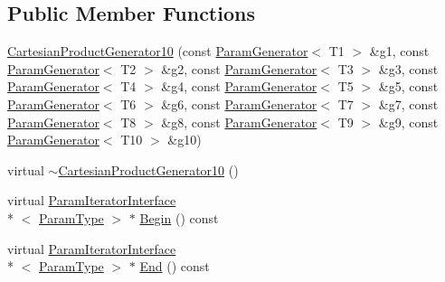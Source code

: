 \subsection*{Public Member Functions}
\begin{DoxyCompactItemize}
\item 
\hyperlink{classtesting_1_1internal_1_1_cartesian_product_generator10_a53d945670e910c0baaf14f3d25f1bbb6}{Cartesian\-Product\-Generator10} (const \hyperlink{classtesting_1_1internal_1_1_param_generator}{Param\-Generator}$<$ T1 $>$ \&g1, const \hyperlink{classtesting_1_1internal_1_1_param_generator}{Param\-Generator}$<$ T2 $>$ \&g2, const \hyperlink{classtesting_1_1internal_1_1_param_generator}{Param\-Generator}$<$ T3 $>$ \&g3, const \hyperlink{classtesting_1_1internal_1_1_param_generator}{Param\-Generator}$<$ T4 $>$ \&g4, const \hyperlink{classtesting_1_1internal_1_1_param_generator}{Param\-Generator}$<$ T5 $>$ \&g5, const \hyperlink{classtesting_1_1internal_1_1_param_generator}{Param\-Generator}$<$ T6 $>$ \&g6, const \hyperlink{classtesting_1_1internal_1_1_param_generator}{Param\-Generator}$<$ T7 $>$ \&g7, const \hyperlink{classtesting_1_1internal_1_1_param_generator}{Param\-Generator}$<$ T8 $>$ \&g8, const \hyperlink{classtesting_1_1internal_1_1_param_generator}{Param\-Generator}$<$ T9 $>$ \&g9, const \hyperlink{classtesting_1_1internal_1_1_param_generator}{Param\-Generator}$<$ T10 $>$ \&g10)
\item 
virtual \hyperlink{classtesting_1_1internal_1_1_cartesian_product_generator10_a9f3d5098141855055fe174dda57092d7}{$\sim$\-Cartesian\-Product\-Generator10} ()
\item 
virtual \hyperlink{classtesting_1_1internal_1_1_param_iterator_interface}{Param\-Iterator\-Interface}\\*
$<$ \hyperlink{classtesting_1_1internal_1_1_cartesian_product_generator10_aa483a5910f5dbfb974b43f93853f4b29}{Param\-Type} $>$ $\ast$ \hyperlink{classtesting_1_1internal_1_1_cartesian_product_generator10_a1b3ac46cd0f29e9654ee0afa18490798}{Begin} () const 
\item 
virtual \hyperlink{classtesting_1_1internal_1_1_param_iterator_interface}{Param\-Iterator\-Interface}\\*
$<$ \hyperlink{classtesting_1_1internal_1_1_cartesian_product_generator10_aa483a5910f5dbfb974b43f93853f4b29}{Param\-Type} $>$ $\ast$ \hyperlink{classtesting_1_1internal_1_1_cartesian_product_generator10_ab8a229952b2bf4ab2eb6f444bc4c4cee}{End} () const 
\end{DoxyCompactItemize}


